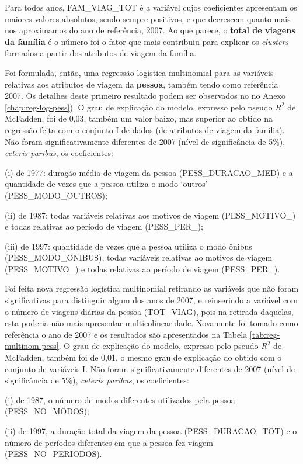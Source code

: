 Para todos anos, FAM_VIAG_TOT é a variável cujos coeficientes apresentam os maiores valores absolutos, sendo sempre positivos, e que decrescem quanto mais nos aproximamos do ano de referência, 2007.
Ao que parece, o \textbf{total de viagens da família} é o número foi o fator que mais contribuiu para explicar os \textit{clusters} formados a partir dos atributos de viagem  da família.

Foi formulada, então, uma regressão logística multinomial para as variáveis relativas aos atributos de viagem da \textbf{pessoa}, também tendo como referência 2007. Os detalhes deste primeiro resultado podem ser observados no no Anexo \ref{chap:reg-log-pess}).
O grau de explicação do modelo, expresso pelo pseudo $R^2$ de McFadden, foi de 0,03, também um valor baixo, mas superior ao obtido na regressão feita com o conjunto I de dados (de atributos de viagem da família).
Não foram significativamente diferentes de 2007 (nível de significância de 5\%), \textit{ceteris paribus}, os coeficientes:
\begin{compactitem}[]
\item (i) de 1977: duração média de viagem da pessoa (PESS_DURACAO_MED) e a quantidade de vezes que a pessoa utiliza o modo `outros' (PESS_MODO_OUTROS);
\item (ii) de 1987: todas variáveis relativas aos motivos de viagem (PESS_MOTIVO_) e todas relativas ao período de viagem (PESS_PER_);
\item (iii) de 1997: quantidade de vezes que a pessoa utiliza o modo ônibus \mbox{(PESS_MODO_ONIBUS)}, todas variáveis relativas ao motivos de viagem (PESS_MOTIVO_) e todas relativas ao período de viagem (PESS_PER_).
\end{compactitem}

Foi feita nova regressão logística multinomial retirando as variáveis que não foram significativas para distinguir algum dos anos de 2007, e reinserindo a variável com o número de viagens diárias da pessoa (TOT_VIAG), pois na retirada daquelas, esta poderia não mais apresentar multicolinearidade. 
Novamente foi tomado como referência o ano de 2007 e os resultados são apresentados na Tabela \ref{tab:reg-multinom-pess}.
O grau de explicação do modelo, expresso pelo pseudo $R^2$ de McFadden, também foi de 0,01, o mesmo grau de explicação do obtido com o conjunto de variáveis I.
Não foram significativamente diferentes de 2007 (nível de significância de 5\%), \textit{ceteris paribus}, os coeficientes:
\begin{compactitem}[]
\item (i) de 1987, o número de modos diferentes utilizados pela pessoa (PESS_NO_MODOS);
\item (ii) de 1997, a duração total da viagem da pessoa (PESS_DURACAO_TOT) e o número de períodos diferentes em que a pessoa fez viagem (PESS_NO_PERIODOS).
\end{compactitem}

